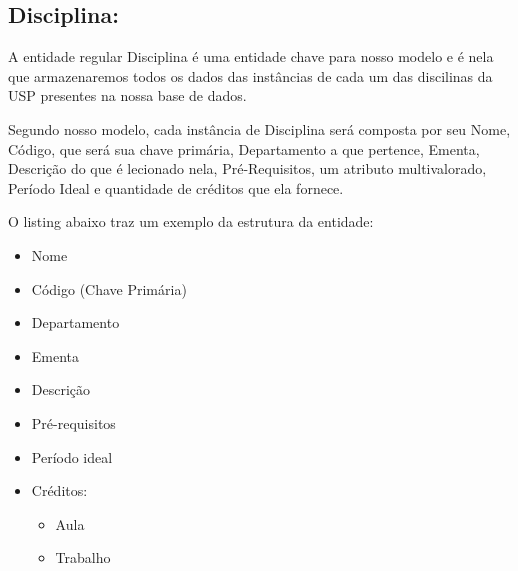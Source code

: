 \documentclass{report}
\begin{document}
\subsection{Disciplina:}
A entidade regular Disciplina é uma entidade chave para nosso modelo e é nela que armazenaremos todos os dados das instâncias de cada um das discilinas da USP presentes na nossa base de dados.
  
  Segundo nosso modelo, cada instância de Disciplina será composta por seu Nome, Código, que será sua chave primária, Departamento a que pertence, Ementa, Descrição do que é lecionado nela, Pré-Requisitos, um atributo multivalorado, Período Ideal e quantidade de créditos que ela fornece.
    
  O listing abaixo traz um exemplo da estrutura da entidade:
\begin{itemize}
  \item Nome
  \item Código (Chave Primária)
  \item Departamento
  \item Ementa
  \item Descrição
  \item Pré-requisitos
  \item Período ideal
  \item Créditos:
  \begin{itemize}
    \item Aula
    \item Trabalho
    \end{itemize}
\end{itemize}
\end{document}
